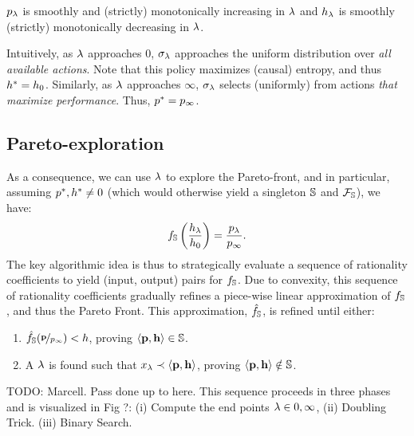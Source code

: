 \begin{proposition}
  $p_\lambda$ is smoothly and (strictly) monotonically increasing in $\lambda$ and $h_\lambda$
  is smoothly (strictly) monotonically decreasing in $\lambda$.
\end{proposition}

Intuitively, as $\lambda$ approaches $0$, $\sigma_\lambda$ approaches the
uniform distribution over \emph{all available actions}. Note that this
policy maximizes (causal) entropy, and thus $h^{*} = h_0$.
Similarly, as $\lambda$ approaches $\infty$, $\sigma_\lambda$ selects (uniformly) from
actions \emph{that maximize performance}. Thus, $p^{*} = p_\infty$.

\subsection{Pareto-exploration}
As a consequence, we can use $\lambda$ to explore the Pareto-front, and
in particular, assuming $p^{*}, h^{*} \neq 0$ (which would otherwise yield a singleton
$\mathbb{S}$ and $\mathcal{F}_{\mathbb{S}}$), we have:
\begin{equation}
  f_\mathbb{S}\left(\frac{h_\lambda}{h_0}\right) = \frac{p_\lambda}{p_\infty}.
\end{equation}
The key algorithmic idea is thus to strategically evaluate a sequence
of rationality coefficients to yield (input, output) pairs for
$f_\mathbb{S}$. Due to convexity, this sequence of rationality
coefficients gradually refines a piece-wise linear approximation of
$f_\mathbb{S}$, and thus the Pareto Front. This approximation, $\hat{f_\mathbb{S}}$, is refined
until either:
\begin{enumerate}
  \item $\hat{f_\mathbb{S}}(\nicefrac{\mathbf{p}}{p_\infty}) < h$, proving $\langle \mathbf{p},
\mathbf{h} \rangle \in \mathbb{S}$.
\item A $\lambda$ is found such that $x_{\lambda} \prec \langle
\mathbf{p}, \mathbf{h} \rangle$, proving $\langle \mathbf{p},
\mathbf{h} \rangle \notin \mathbb{S}$.

\end{enumerate}

TODO: Marcell. Pass done up to here.
This sequence proceeds in three phases and is visualized in Fig ?:
(i) Compute the end points $\lambda \in {0, \infty}$, (ii) Doubling Trick.
(iii) Binary Search.


